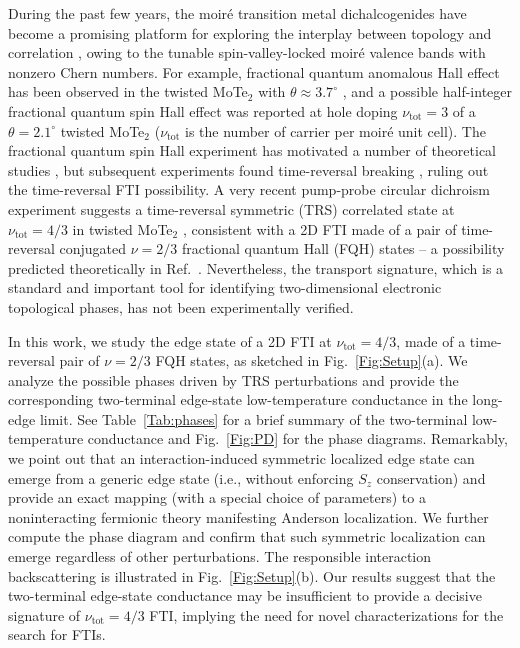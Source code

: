 \documentclass[aps,prx,amsmath,superscriptaddress,twocolumn,bibnotes,longbibliography,floatfix]{revtex4-2}
\begin{document}
	During the past few years, the moir\'e transition metal dichalcogenides have become a promising platform for exploring the interplay between topology and correlation \cite{WuF2018,WuF2019b,PanH2020a,PanH2022,XieM2023b,MakKF2022,LiB2026}, owing to the tunable spin-valley-locked moir\'e valence bands with nonzero Chern numbers. For example, fractional quantum anomalous Hall effect has been observed in the twisted MoTe$_2$ with $\theta\approx 3.7^{\circ}$ \cite{CaiJ2023a,ZengY2023a,ParkH2023,XuF2023a,XuF2025b}, and a possible half-integer fractional quantum spin Hall effect was reported at hole doping $\nu_{\text{tot}}=3$ of a $\theta=2.1^{\circ}$ twisted MoTe$_2$ \cite{KangK2024c} ($\nu_{\text{tot}}$ is the number of carrier per moir\'e unit cell). The fractional quantum spin Hall experiment has motivated a number of theoretical studies \cite{ZhangYH2024b,JianCM2025,ZhangYH2024c,May-MannJ2025,SodemannVilladiegoI2024,ChouYZ2024,ReddyAP2024a,WenR2024a,KwanYH2026a,ChenF2024,XuC2025b,LuT2025}, but subsequent experiments found time-reversal breaking \cite{ParkH2024,XuF2025a,AnL2025,KangK2025b}, ruling out the time-reversal FTI possibility.  A very recent pump-probe circular dichroism experiment suggests a time-reversal symmetric (TRS) correlated state at $\nu_{\text{tot}}=4/3$ in twisted MoTe$_2$ \cite{WangY2026}, consistent with a 2D FTI made of a pair of time-reversal conjugated $\nu=2/3$ fractional quantum Hall (FQH) states -- a possibility predicted theoretically in Ref.~\cite{KwanYH2026a}. Nevertheless, the transport signature, which is a standard and important tool for identifying two-dimensional electronic topological phases, has not been experimentally verified.


	In this work, we study the edge state of a 2D FTI at $\nu_{\text{tot}}=4/3$, made of a time-reversal pair of $\nu=2/3$ FQH states, as sketched in Fig.~\ref{Fig:Setup}(a). We analyze the possible phases driven by TRS perturbations and provide the corresponding two-terminal edge-state low-temperature conductance in the long-edge limit. See Table~\ref{Tab:phases} for a brief summary of the two-terminal low-temperature conductance and Fig.~\ref{Fig:PD} for the phase diagrams. Remarkably, we point out that an interaction-induced symmetric localized edge state can emerge from a generic edge state (i.e., without enforcing $S_z$ conservation) and provide an exact mapping (with a special choice of parameters) to a noninteracting fermionic theory manifesting Anderson localization. We further compute the phase diagram and confirm that such symmetric localization can emerge regardless of other perturbations. The responsible interaction backscattering is illustrated in Fig.~\ref{Fig:Setup}(b). Our results suggest that the two-terminal edge-state conductance may be insufficient to provide a decisive signature of $\nu_{\text{tot}}=4/3$ FTI, implying the need for novel characterizations for the search for FTIs.
\end{document}
